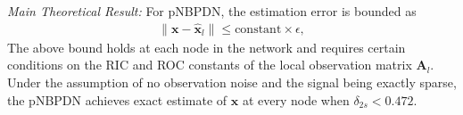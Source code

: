 \documentclass[journal]{IEEEtran}
\newcommand{\mbx}{\mathbf{x}}
\newcommand{\mbA}{\mathbf{A}}
\newcommand{\supp}{\ensuremath{\texttt{supp}}}
\begin{document}
\emph{Main Theoretical Result:} For pNBPDN, the estimation error is bounded as
\begin{eqnarray}
\|\mbx-\hat{\mbx}_l\| \leq \text{constant} \times \epsilon,
\end{eqnarray}
The above bound holds at each node in the network and requires certain conditions on the RIC and ROC constants of the local observation matrix $\mbA_l$. Under the assumption of no observation noise and the signal being exactly sparse, the pNBPDN achieves exact estimate of $\mbx$ at every node when $\delta_{2s} < 0.472$.
\end{document}
